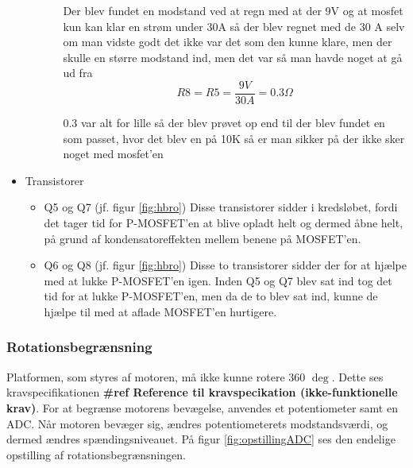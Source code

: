 \begin{itemize}
\begin{itemize}
\begin{itemize}
		Der blev fundet en modstand ved at regn med at der 9V og at mosfet kun kan klar en strøm under 30A så der blev regnet med de 30 A selv om man vidste godt det ikke var det som den kunne klare, men der skulle en større modstand ind, men det var så man havde noget at gå ud fra 
		\begin{displaymath}
		R8=R5=\frac {9V}{30A} =0.3\Omega
		\end{displaymath}
		
		
		0.3 var alt for lille så der blev prøvet op end til der blev fundet en som passet, hvor det blev en på 10K så er man sikker på der ikke sker noget med mosfet’en 
		
		
	\end{itemize}
\end{itemize}

\item Transistorer
\begin{itemize}
	\item Q5 og Q7 (jf. figur \ref{fig:hbro})
	Disse transistorer sidder i kredsløbet, fordi det tager tid for P-MOSFET'en at blive opladt helt og dermed åbne helt, på grund af kondensatoreffekten mellem benene på MOSFET'en.
	
	\item Q6 og Q8 (jf. figur \ref{fig:hbro})
	Disse to transistorer sidder der for at hjælpe med at lukke P-MOSFET'en igen. Inden Q5 og Q7 blev sat ind tog det tid for at lukke P-MOSFET'en, men da de to blev sat ind, kunne de hjælpe til med at aflade MOSFET'en hurtigere. 
\end{itemize}
\end{itemize}

\subsubsection{Rotationsbegrænsning}
Platformen, som styres af motoren, må ikke kunne rotere 360 \(\deg\). Dette ses kravspecifikationen \textbf{\#ref Reference til kravspecikation (ikke-funktionelle krav)}. For at begrænse motorens bevægelse, anvendes et potentiometer samt en ADC. Når motoren bevæger sig, ændres potentiometerets modstandsværdi, og dermed ændres spændingsniveauet. På figur \ref{fig:opstillingADC} ses den endelige opstilling af rotationsbegrænsningen.

